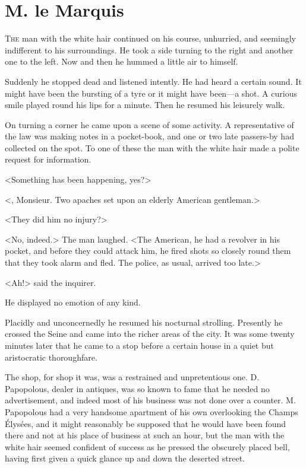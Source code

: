 \chapter{M. le Marquis}



\lettrine{T}{he} man with the white hair continued on his course, unhurried, and seemingly indifferent to his surroundings. He took a side turning to the right and another one to the left. Now and then he hummed a little air to himself.

Suddenly he stopped dead and listened intently. He had heard a certain sound. It might have been the bursting of a tyre or it might have been—a shot. A curious smile played round his lips for a minute. Then he resumed his leisurely walk.

On turning a corner he came upon a scene of some activity. A representative of the law was making notes in a pocket-book, and one or two late passers-by had collected on the spot. To one of these the man with the white hair made a polite request for information.

<Something has been happening, yes?>

<, Monsieur. Two apaches set upon an elderly American gentleman.>

<They did him no injury?>

<No, indeed.> The man laughed. <The American, he had a revolver in his pocket, and before they could attack him, he fired shots so closely round them that they took alarm and fled. The police, as usual, arrived too late.>

<Ah!> said the inquirer.

He displayed no emotion of any kind.

Placidly and unconcernedly he resumed his nocturnal strolling. Presently he crossed the Seine and came into the richer areas of the city. It was some twenty minutes later that he came to a stop before a certain house in a quiet but aristocratic thoroughfare.

The shop, for shop it was, was a restrained and unpretentious one. D. Papopolous, dealer in antiques, was so known to fame that he needed no advertisement, and indeed most of his business was not done over a counter. M. Papopolous had a very handsome apartment of his own overlooking the Champs Élysées, and it might reasonably be supposed that he would have been found there and not at his place of business at such an hour, but the man with the white hair seemed confident of success as he pressed the obscurely placed bell, having first given a quick glance up and down the deserted street.

